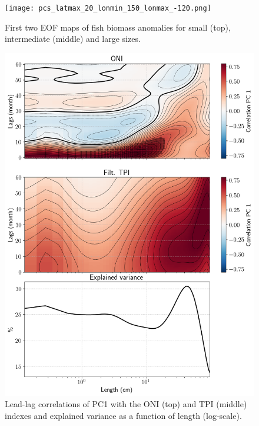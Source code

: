 \begin{figure}
    \centering
    \texttt{[image: pcs\_latmax\_20\_lonmin\_150\_lonmax\_-120.png]}
    \caption{First two EOF maps of fish biomass anomalies for small (top), intermediate (middle) and large sizes.}
    \label{fig:eofpcs}
\end{figure}


\begin{figure}
    \centering
    \includegraphics[scale=0.5]{figs/correlations_eof_oni_tpi_eof_1.png}
    \caption{Lead-lag correlations of PC1 with the ONI (top) and TPI (middle) indexes and explained variance as a function of length (log-scale).}
    \label{fig:pc_corrs}
\end{figure}

